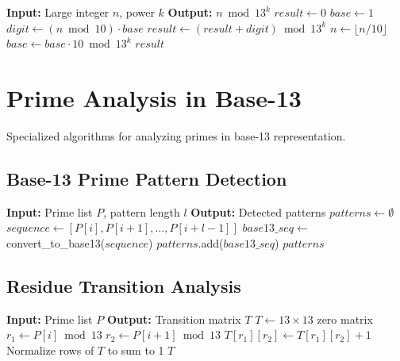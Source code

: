 \documentclass[12pt,a4paper]{report}
\begin{document}
\begin{algorithm}[H]
\caption{Fast Modulo Power Calculation}
\begin{algorithmic}[1]
\STATE \textbf{Input:} Large integer $n$, power $k$
\STATE \textbf{Output:} $n \bmod 13^k$
\STATE $result \leftarrow 0$
\STATE $base \leftarrow 1$
    \STATE $digit \leftarrow (n \bmod 10) \cdot base$
    \STATE $result \leftarrow (result + digit) \bmod 13^k$
    \STATE $n \leftarrow \lfloor n / 10 \rfloor$
    \STATE $base \leftarrow base \cdot 10 \bmod 13^k$
\ENDFOR
\RETURN $result$
\end{algorithmic}
\end{algorithm}

\section{Prime Analysis in Base-13}

Specialized algorithms for analyzing primes in base-13 representation.

\subsection{Base-13 Prime Pattern Detection}

\begin{algorithm}[H]
\caption{Base-13 Pattern Detection}
\begin{algorithmic}[1]
\STATE \textbf{Input:} Prime list $P$, pattern length $l$
\STATE \textbf{Output:} Detected patterns
\STATE $patterns \leftarrow \emptyset$
    \STATE $sequence \leftarrow [P[i], P[i+1], \ldots, P[i+l-1]]$
    \STATE $base13\_seq \leftarrow$ convert\_to\_base13($sequence$)
        \STATE $patterns$.add($base13\_seq$)
    \ENDIF
\ENDFOR
\RETURN $patterns$
\end{algorithmic}
\end{algorithm}

\subsection{Residue Transition Analysis}

\begin{algorithm}[H]
\caption{Residue Transition Matrix Construction}
\begin{algorithmic}[1]
\STATE \textbf{Input:} Prime list $P$
\STATE \textbf{Output:} Transition matrix $T$
\STATE $T \leftarrow 13 \times 13$ zero matrix
    \STATE $r_1 \leftarrow P[i] \bmod 13$
    \STATE $r_2 \leftarrow P[i+1] \bmod 13$
    \STATE $T[r_1][r_2] \leftarrow T[r_1][r_2] + 1$
\ENDFOR
\STATE Normalize rows of $T$ to sum to 1
\RETURN $T$
\end{algorithmic}
\end{algorithm}
\end{document}
